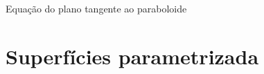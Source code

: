 \begin{example}{Equação do plano tangente ao paraboloide}{}
\begin{center}
\begin{comment}
		\foreach \altura in {0.0125,0.025,...,1.0}{
			\pgfmathparse{sqrt(\altura)}
			\pgfmathsetmacro{\radio}{\pgfmathresult}
			\draw[blue!50,opacity=0.5] plot[domain=\tini:\tfin,smooth,variable=\t] ({\radio*cos(\t r)},{\radio*sin(\t r)},{\altura}); 
		}
		\draw[-latex] (0,0,0) -- (0,0,1.75) node [above] {$z$};	
		\foreach \altura in {0.0125,0.025,...,1.0}{
			\pgfmathparse{sqrt(\altura)}
			\pgfmathsetmacro{\radio}{\pgfmathresult}
			\draw[blue!50,opacity=0.5] plot[domain=\tfin:\tend,smooth,variable=\t] ({\radio*cos(\t r)},{\radio*sin(\t r)},{\altura}); 
		}

    
\draw[dashed,gray!50] (0.5,-0.5,0) -- (0.5,-0.5,{2*(0.5)^2});
\draw[dashed,gray!50] (0.5,0,0) -- (0.5,-0.5,0)--(0,-0.5,0);


\draw[red!20,fill=red!20,opacity=0.5] (-1/2,-1,0) -- (1,1/2,0) -- (3,1/2,2) -- (3/2,-1,2) -- cycle;

\filldraw[red!150] (0.5,-0.5,{2*(0.5)^2}) circle (1pt) node[left]{\footnotesize$\left(x_0,y_0,x_0^2+y_0^2\right)$};




  
	\end{tikzpicture}\end{comment}
\end{center}
\end{example}



\section{Superfícies parametrizada}

